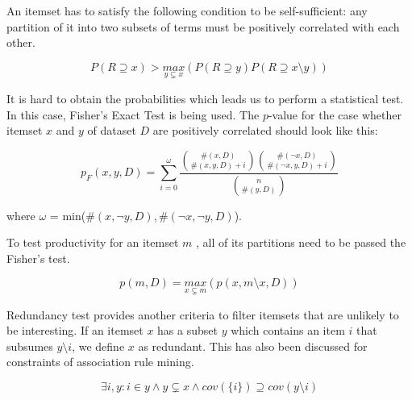 \begin{definition}
\label{df:productivity}
An itemset has to satisfy the following condition to be self-sufficient: any partition of it into two subsets of terms must be positively correlated with each other.

\begin{equation}
\label{productive}
P(R \supseteq x) >  \underset{y \subsetneq x}{max}(P(R \supseteq y)P(R \supseteq x \setminus y))
\end{equation}

It is hard to obtain the probabilities which leads us to perform a statistical test. In this case, Fisher's Exact Test is being used. The $p$-value for the case whether itemset $x$ and $y$ of dataset $D$ are positively correlated should look like this:

\begin{equation}
\label{fishersp}
p_{F}(x, y, D) = \sum_{i=0}^{\omega} \frac{\binom{\#(x, D)}{\#(x, y, D)+i}\binom{\#(\neg x, D)}{\#(\neg x, y, D)+i}}{\binom{n}{\#(y, D)}}
\end{equation}

where $\omega$ = min($\#(x,\neg y, D), \#(\neg x, \neg y, D)$). \cite{ssi}

To test productivity for an itemset $m$ , all of its partitions need to be passed the Fisher's test.

\begin{equation}
\label{fisherspartition}
p(m,D) = \underset{x \subsetneq m}{max}(p(x, m \setminus x, D))
\end{equation}


\end{definition}


\begin{definition}
\label{df:redundancy}
Redundancy test provides another criteria to filter itemsets that are unlikely to be interesting. If an itemset $x$ has a subset $y$ which contains an item $i$ that subsumes $y\setminus i$, we define $x$ as redundant. This has also been discussed for constraints of association rule mining. \cite{redundant}

\begin{equation}
\label{eq:redundant}
\exists i, y : i\in y \wedge y \subsetneq x \wedge cov(\{i\}) \supseteq cov(y \setminus i)
\end{equation}

\end{definition}


